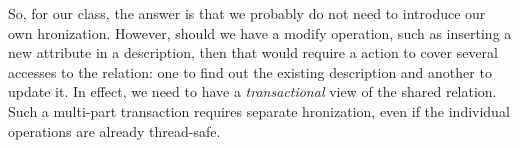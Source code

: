 So, for our  class, the answer is that we probably do not need to introduce our own hronization. However, should we have a modify operation, such as inserting a new attribute in a description, then that would require a  action to cover several accesses to the  relation: one to find out the existing description and another to update it. In effect, we need to have a \emph{transactional} view of the shared relation. Such a multi-part transaction requires separate hronization, even if the individual operations are already thread-safe.


